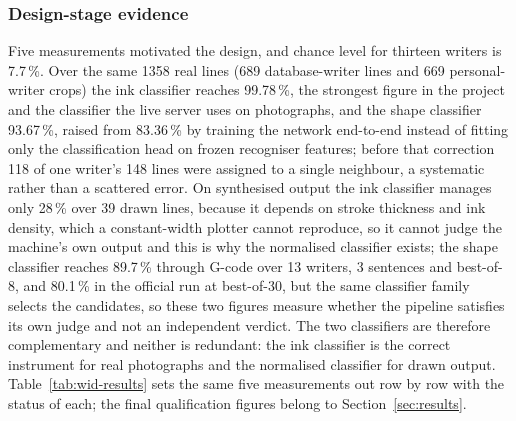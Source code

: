 \subsubsection{Design-stage evidence}

Five measurements motivated the design, and chance level for thirteen writers is 7.7\,\%.
Over the same 1358 real lines (689 database-writer lines and 669 personal-writer crops) the ink classifier reaches 99.78\,\%, the strongest figure in the project and the classifier the live server uses on photographs, and the shape classifier 93.67\,\%, raised from 83.36\,\% by training the network end-to-end instead of fitting only the classification head on frozen recogniser features; before that correction 118 of one writer's 148 lines were assigned to a single neighbour, a systematic rather than a scattered error.
On synthesised output the ink classifier manages only 28\,\% over 39 drawn lines, because it depends on stroke thickness and ink density, which a constant-width plotter cannot reproduce, so it cannot judge the machine's own output and this is why the normalised classifier exists; the shape classifier reaches 89.7\,\% through G-code over 13 writers, 3 sentences and best-of-8, and 80.1\,\% in the official run at best-of-30, but the same classifier family selects the candidates, so these two figures measure whether the pipeline satisfies its own judge and not an independent verdict.
The two classifiers are therefore complementary and neither is redundant: the ink classifier is the correct instrument for real photographs and the normalised classifier for drawn output.
Table~\ref{tab:wid-results} sets the same five measurements out row by row with the status of each; the final qualification figures belong to Section~\ref{sec:results}.

